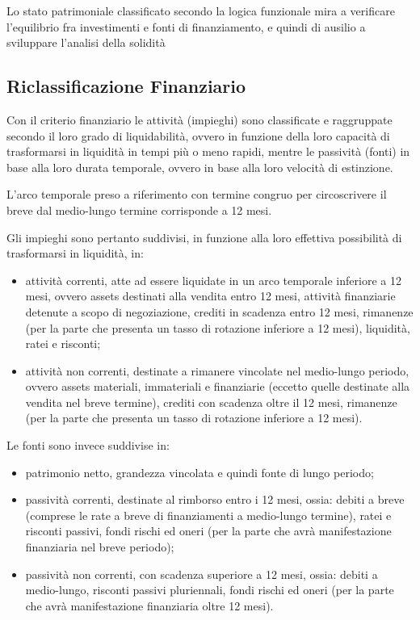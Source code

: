 Lo stato patrimoniale classificato secondo la logica funzionale mira a verificare l’equilibrio fra investimenti e fonti di finanziamento, e quindi di ausilio a sviluppare l’analisi della solidità


\subsection{Riclassificazione Finanziario}

Con il criterio finanziario le attività (impieghi) sono classificate e raggruppate secondo il loro grado di liquidabilità, ovvero in funzione della loro capacità di trasformarsi in liquidità in tempi più o meno rapidi, mentre le passività (fonti) in base alla loro durata temporale, ovvero in base alla loro velocità di estinzione.

L’arco temporale preso a riferimento con termine congruo per circoscrivere il breve dal medio-lungo termine corrisponde a 12 mesi.

Gli impieghi sono pertanto suddivisi, in funzione alla loro effettiva possibilità di trasformarsi in liquidità, in:
\begin{itemize}
 \item attività correnti, atte ad essere liquidate in un arco temporale inferiore a 12 mesi, ovvero assets destinati alla vendita entro 12 mesi, attività finanziarie detenute a scopo di negoziazione, crediti in scadenza entro 12 mesi, rimanenze (per la parte che presenta un tasso di rotazione inferiore a 12 mesi), liquidità, ratei e risconti;
 \item attività non correnti, destinate a rimanere vincolate nel medio-lungo periodo, ovvero assets materiali, immateriali e finanziarie (eccetto quelle destinate alla vendita nel breve termine), crediti con scadenza oltre il 12 mesi, rimanenze (per la parte che presenta un tasso di rotazione inferiore a 12 mesi).
\end{itemize}

Le fonti sono invece suddivise in:
\begin{itemize}
 \item patrimonio netto, grandezza vincolata e quindi fonte di lungo periodo;
 \item passività correnti, destinate al rimborso entro i 12 mesi, ossia: debiti a breve (comprese le rate a breve di finanziamenti a medio-lungo termine), ratei e risconti passivi, fondi rischi ed oneri (per la parte che avrà manifestazione finanziaria nel breve periodo);
 \item passività non correnti, con scadenza superiore a 12 mesi, ossia: debiti a medio-lungo, risconti passivi pluriennali, fondi rischi ed oneri (per la parte che avrà manifestazione finanziaria oltre 12 mesi).
\end{itemize}

